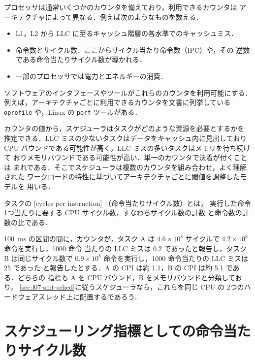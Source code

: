 \documentclass[../main.tex]{subfiles}
\begin{document}
プロセッサは通常いくつかのカウンタを備えており，利用できるカウンタは
アーキテクチャによって異なる．例えば次のようなものを数える．
\begin{itemize}
  \item L1，L2 から LLC に至るキャッシュ階層の各水準でのキャッシュミス．
  \item 命令数とサイクル数．ここからサイクル当たり命令数（IPC）や，その
    逆数である命令当たりサイクル数が導かれる．
  \item 一部のプロセッサでは電力とエネルギーの消費．
\end{itemize}
ソフトウェアのインタフェースやツールがこれらのカウンタを利用可能にする．
例えば，アーキテクチャごとに利用できるカウンタを文書に列挙している
\texttt{oprofile} や，Linux の \texttt{perf} ツールがある．

カウンタの値から，スケジューラはタスクがどのような資源を必要とするかを
推定できる．LLC ミスの少ないタスクはデータをキャッシュ内に見出しており
CPU バウンドである可能性が高く，LLC ミスの多いタスクはメモリを待ち続けて
おりメモリバウンドである可能性が高い．単一のカウンタで決着が付くことは
まれである．そこでスケジューラは複数のカウンタを組み合わせ，よく理解された
ワークロードの特性に基づいてアーキテクチャごとに閾値を調整したモデルを
用いる．

\begin{definition}[命令当たりサイクル数]
  タスクの [cycles per instruction]%
  （命令当たりサイクル数）とは，
  実行した命令1つ当たりに要する CPU サイクル数，すなわちサイクル数の計数
  と命令数の計数の比である．
\end{definition}

\begin{example}
  \SI{100}{\milli\second} の区間の間に，カウンタが，タスク A は
  $4.6 \times 10^8$ サイクルで $4.2 \times 10^8$ 命令を実行し，1000 命令
  当たりの LLC ミスは 0.2 であったと報告し，タスク B は同じサイクル数で
  $0.9 \times 10^8$ 命令を実行し，1000 命令当たりの LLC ミスは 25 であった
  と報告したとする．A の CPI は約 1.1，B の CPI は約 5.1 である．どちらの
  指標も A を CPU バウンド，B をメモリバウンドと分類しており，
  \cref{sec:l07-smt-sched}に従うスケジューラなら，これらを同じ CPU の
  2つのハードウェアスレッド上に配置するであろう．
\end{example}

\section{スケジューリング指標としての命令当たりサイクル数}
\label{sec:l07-cpi}
\end{document}
